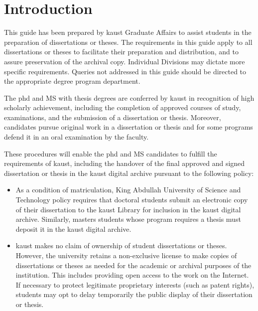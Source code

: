

\chapter{Introduction}


This guide has been prepared by \gls{kaust} Graduate Affairs to assist students in the preparation of dissertations or theses. The requirements in this guide apply to all dissertations or theses to facilitate their preparation and distribution, and to assure preservation of the archival copy.  Individual Divisions may dictate more specific requirements.  Queries not addressed in this guide should be directed to the appropriate degree program department.

The \gls{phd} and \gls{MS} with thesis degrees are conferred by \gls{kaust} in recognition of high scholarly achievement, including the completion of approved courses of study, examinations, and the submission of a dissertation or thesis. Moreover, candidates pursue original work in a dissertation or thesis and for some programs defend it in an oral examination by the faculty.   
 
These procedures will enable the \gls{phd} and \gls{MS} candidates to fulfill the requirements of \acrlong{kaust}, including the handover of the final approved and signed dissertation or thesis in the \gls{kaust} digital archive pursuant to the following policy:

\begin{itemize}
\item As a condition of matriculation, King Abdullah University of Science and Technology policy requires that doctoral students submit an electronic copy of their dissertation to the \gls{kaust} Library for inclusion in the \gls{kaust} digital archive. Similarly, masters students whose program requires a thesis must deposit it in the \gls{kaust} digital archive.

\item \gls{kaust} makes no claim of ownership of student dissertations or theses. However, the university retains a non-exclusive license to make copies of dissertations or theses as needed for the academic or archival purposes of the institution. This includes providing open access to the work on the Internet.  If necessary to protect legitimate proprietary interests (such as patent rights), students may opt to delay temporarily the public display of their dissertation or thesis.

\end{itemize}

